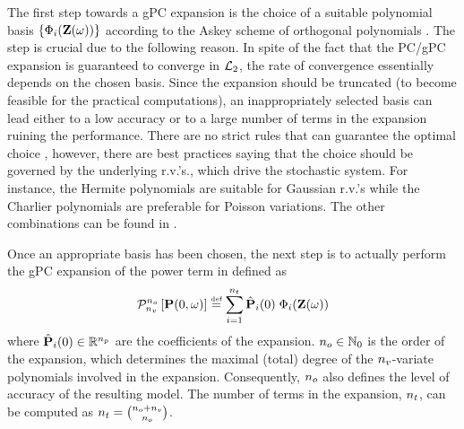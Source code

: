 The first step towards a gPC expansion is the choice of a suitable polynomial basis $\{ \Phi_i(\mathbf{Z}(\omega)) \}$ according to the Askey scheme of orthogonal polynomials \cite{xiu2002}. The step is crucial due to the following reason. In spite of the fact that the PC/gPC expansion is guaranteed to converge in $\mathcal{L}_{2}$, the rate of convergence essentially depends on the chosen basis. Since the expansion should be truncated (to become feasible for the practical computations), an inappropriately selected basis can lead either to a low accuracy or to a large number of terms in the expansion ruining the performance. There are no strict rules that can guarantee the optimal choice \cite{knio2006}, however, there are best practices saying that the choice should be governed by the underlying r.v.'s., which drive the stochastic system. For instance, the Hermite polynomials are suitable for Gaussian r.v.'s while the Charlier polynomials are preferable for Poisson variations. The other combinations can be found in \cite{xiu2002}.

Once an appropriate basis has been chosen, the next step is to actually perform the gPC expansion of the power term in  defined as
\begin{equation} \elabel{pc-expansion}
  \oPC{\vars}{\pcorder}{\vP(0, \o)} \eqdef \sum_{i = 1}^{\pcterms} \pcc{\vP}_i(0) \; \pcb_i(\vZ(\o))
\end{equation}
where $\hat{\mathbf{P}}_i(0) \in \mathbb{R}^{n_p}$ are the coefficients of the expansion. ${n_o} \in \mathbb{N}_{0}$ is the order of the expansion, which determines the maximal (total) degree of the ${n_v}$-variate polynomials involved in the expansion. Consequently, ${n_o}$ also defines the level of accuracy of the resulting model. The number of terms in the expansion, ${n_t}$, can be computed as ${n_t} = {{n_o} + {n_v} \choose {n_o}}$.

